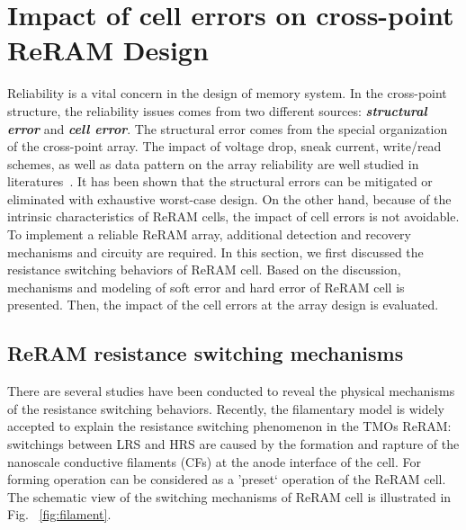 \section{Impact of cell errors on cross-point ReRAM Design}
\label{sec:intro}

Reliability is a vital concern in the design of memory system. In the cross-point structure, the reliability issues comes from two different sources: \emph{\textbf{structural error}} and \emph{\textbf{cell error}}. The structural error comes from the special organization of the cross-point array. The impact of voltage drop, sneak current, write/read schemes, as well as data pattern on the array reliability are well studied in literatures~\cite{jiale,Dimin_ISLPED}. It has been shown that the structural errors can be mitigated or eliminated with exhaustive worst-case design. On the other hand, because of the intrinsic characteristics of ReRAM cells, the impact of cell errors is not avoidable. To implement a reliable ReRAM array, additional detection and recovery mechanisms and circuity are required. In this section, we first discussed the resistance switching behaviors of ReRAM cell. Based on the discussion, mechanisms and modeling of soft error and hard error of ReRAM cell is presented. Then, the impact of the cell errors at the array design is evaluated.

\subsection{ReRAM resistance switching mechanisms}
There are several studies have been conducted to reveal the physical mechanisms of the resistance switching behaviors. Recently, the filamentary model is widely accepted to explain the resistance switching phenomenon in the TMOs ReRAM: switchings between LRS and HRS are caused by the formation and rapture of the nanoscale conductive filaments (CFs) at the anode interface of the cell. For forming operation can be considered as a 'preset` operation of the ReRAM cell. The schematic view of the switching mechanisms of ReRAM cell is illustrated in Fig. ~\ref{fig:filament}.

